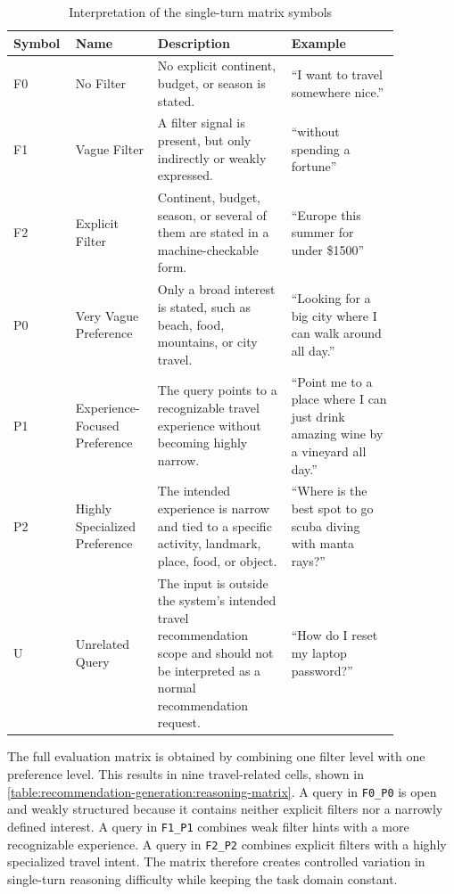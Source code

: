 \begin{table}[htbp]
\centering
\begin{tabular}{p{0.1\linewidth}p{0.18\linewidth}p{0.32\linewidth}p{0.26\linewidth}}
\hline
Symbol & Name & Description & Example \\
\hline
F0 & No Filter & No explicit continent, budget, or season is stated. & ``I want to travel somewhere nice.'' \\
F1 & Vague Filter & A filter signal is present, but only indirectly or weakly expressed. & ``without spending a fortune'' \\
F2 & Explicit Filter & Continent, budget, season, or several of them are stated in a machine-checkable form. & ``Europe this summer for under \$1500'' \\
P0 & Very Vague Preference & Only a broad interest is stated, such as beach, food, mountains, or city travel. & ``Looking for a big city where I can walk around all day.'' \\
P1 & Experience-Focused Preference & The query points to a recognizable travel experience without becoming highly narrow. & ``Point me to a place where I can just drink amazing wine by a vineyard all day.'' \\
P2 & Highly Specialized Preference & The intended experience is narrow and tied to a specific activity, landmark, place, food, or object. & ``Where is the best spot to go scuba diving with manta rays?'' \\
U & Unrelated Query & The input is outside the system's intended travel recommendation scope and should not be interpreted as a normal recommendation request. & ``How do I reset my laptop password?'' \\
\hline
\end{tabular}
\caption{Interpretation of the single-turn matrix symbols}
\label{table:recommendation-generation:reasoning-matrix-legend}
\end{table}

The full evaluation matrix is obtained by combining one filter level with one preference level. This results in nine travel-related cells, shown in \autoref{table:recommendation-generation:reasoning-matrix}. A query in \texttt{F0\_P0} is open and weakly structured because it contains neither explicit filters nor a narrowly defined interest. A query in \texttt{F1\_P1} combines weak filter hints with a more recognizable experience. A query in \texttt{F2\_P2} combines explicit filters with a highly specialized travel intent. The matrix therefore creates controlled variation in single-turn reasoning difficulty while keeping the task domain constant.

